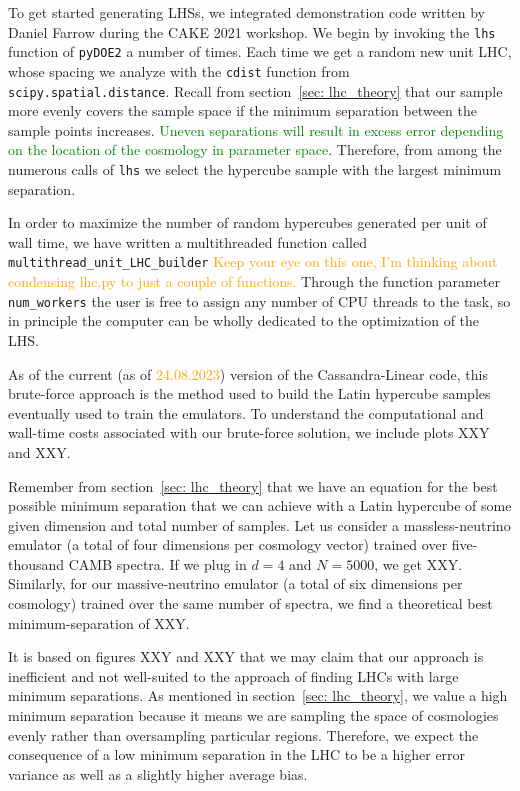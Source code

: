 To get started generating LHSs, we integrated demonstration code written by 
Daniel Farrow  
during the CAKE 2021 workshop. We begin by invoking the \verb|lhs| function of
\verb|pyDOE2| a number of times. Each time we get a random new unit LHC, whose
spacing we analyze with the \verb|cdist| function from
\verb|scipy.spatial.distance|.  Recall from section~\ref{sec: lhc_theory} that
our sample more evenly covers the sample space if the minimum separation 
between the sample points increases. \textcolor{green}{Uneven separations will
result in excess error depending on the location of the cosmology in parameter
space}. Therefore, from among the numerous calls of \verb|lhs| we select the
hypercube sample with the largest minimum separation.

In order to maximize the number of random hypercubes generated per unit of
wall time, we have written a multithreaded function called
\verb|multithread_unit_LHC_builder| \textcolor{orange}{Keep your eye on this
one, I'm thinking about condensing lhc.py to just a couple of functions.}
Through the function parameter \verb|num_workers| the user is free to assign
any number of CPU threads to the task, so in principle the computer can be
wholly dedicated to the optimization of the LHS.  

As of the current (as of \textcolor{orange}{24.08.2023}) version of the
Cassandra-Linear code, this brute-force approach is the method used to build
the Latin hypercube samples eventually used to train the emulators. To 
understand the computational and wall-time costs associated with our
brute-force solution, we include plots XXY and XXY.

Remember from section~\ref{sec: lhc_theory} that we have an equation for the
best possible minimum separation that we can achieve with a Latin hypercube
of some given dimension and total number of samples. Let us consider a massless-neutrino emulator (a total of four dimensions per cosmology vector)
trained over five-thousand CAMB spectra. If we plug in $d = 4$ and $N=5000$,
we get XXY. Similarly, for our massive-neutrino emulator (a total of six 
dimensions per cosmology) trained over the same number of spectra, we find a 
theoretical best minimum-separation of XXY. 

It is based on figures XXY and XXY that we may claim that our approach is
inefficient and not well-suited to the approach of finding LHCs with large
minimum separations. As mentioned in section~\ref{sec: lhc_theory},
we value a high minimum separation because it means we are sampling the
space of cosmologies evenly rather than oversampling particular regions.
Therefore, we expect the consequence of a low minimum separation in the LHC to
be a higher error variance as well as a slightly higher average bias.

